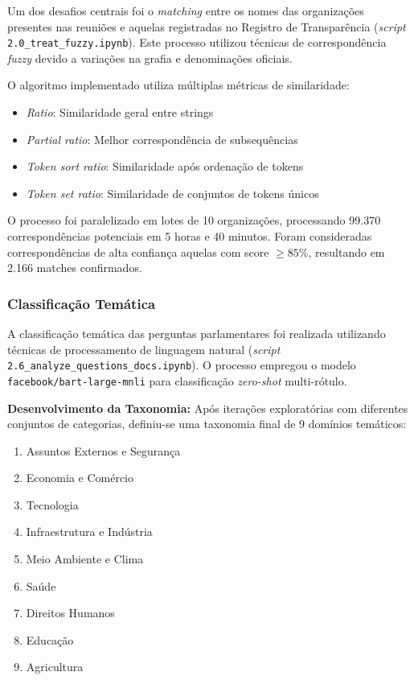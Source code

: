 Um dos desafios centrais foi o \textit{matching} entre os nomes das organizações presentes nas reuniões e aquelas registradas no Registro de Transparência (\textit{script} \texttt{2.0\_treat\_fuzzy.ipynb}). Este processo utilizou técnicas de correspondência \textit{fuzzy} devido a variações na grafia e denominações oficiais.

O algoritmo implementado utiliza múltiplas métricas de similaridade:
\begin{itemize}
    \item \textit{Ratio}: Similaridade geral entre strings
    \item \textit{Partial ratio}: Melhor correspondência de subsequências
    \item \textit{Token sort ratio}: Similaridade após ordenação de tokens
    \item \textit{Token set ratio}: Similaridade de conjuntos de tokens únicos
\end{itemize}

O processo foi paralelizado em lotes de 10 organizações, processando 99.370 correspondências potenciais em 5 horas e 40 minutos. Foram consideradas correspondências de alta confiança aquelas com score $\geq 85\%$, resultando em 2.166 matches confirmados.

\subsubsection{Classificação Temática}

A classificação temática das perguntas parlamentares foi realizada utilizando técnicas de processamento de linguagem natural (\textit{script} \texttt{2.6\_analyze\_questions\_docs.ipynb}). O processo empregou o modelo \texttt{facebook/bart-large-mnli} para classificação \textit{zero-shot} multi-rótulo.

\textbf{Desenvolvimento da Taxonomia:} Após iterações exploratórias com diferentes conjuntos de categorias, definiu-se uma taxonomia final de 9 domínios temáticos:
\begin{enumerate}
    \item Assuntos Externos e Segurança
    \item Economia e Comércio  
    \item Tecnologia
    \item Infraestrutura e Indústria
    \item Meio Ambiente e Clima
    \item Saúde
    \item Direitos Humanos
    \item Educação
    \item Agricultura
\end{enumerate}

